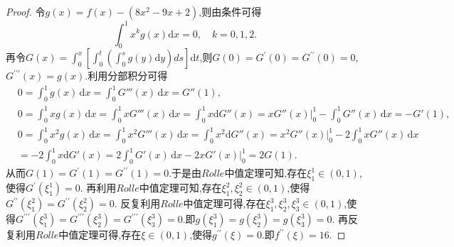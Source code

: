 \documentclass[../../main.tex]{subfiles}%
\begin{document}
\begin{proof}
令\(g(x)=f(x)-(8x^2 - 9x + 2)\),则由条件可得
\[
\int_0^1 x^k g(x)\mathrm{d}x = 0, \quad k = 0,1,2.
\]
再令\(G(x)=\int_0^x\left[\int_0^t\left(\int_0^s g(y)\mathrm{d}y\right)ds\right]\mathrm{d}t\),则\(G(0)=G^\prime(0)=G^{\prime\prime}(0)=0\),\(G^{\prime\prime\prime}(x)=g(x)\).利用分部积分可得
\begin{align*}
&0=\int_0^1{g\left( x \right)\,\mathrm{d}x}=\int_0^1{G'''\left( x \right)\,\mathrm{d}x}=G''\left( 1 \right) ,
\\
&0=\int_0^1{xg\left( x \right)\,\mathrm{d}x}=\int_0^1{xG'''\left( x \right)\,\mathrm{d}x}=\int_0^1{x\mathrm{d}G''\left( x \right)}=xG''\left( x \right) \Big |_{0}^{1}-\int_0^1{G''\left( x \right)\,\mathrm{d}x}=-G'\left( 1 \right) ,
\\
&0=\int_0^1{x^2g\left( x \right)\,\mathrm{d}x}=\int_0^1{x^2G'''\left( x \right)\,\mathrm{d}x}=\int_0^1{x^2\mathrm{d}G''\left( x \right)}=x^2G''\left( x \right) \Big |_{0}^{1}-2\int_0^1{xG''\left( x \right)\,\mathrm{d}x}
\\
&=-2\int_0^1{x\mathrm{d}G'\left( x \right)}=2\int_0^1{G'\left( x \right)\,\mathrm{d}x}-2xG'\left( x \right) \Big |_{0}^{1}=2G\left( 1 \right) .
\end{align*}
从而\(G(1)=G^\prime(1)=G^{\prime\prime}(1)=0\).于是由\(Rolle\)中值定理可知,存在\(\xi_1^1\in(0,1)\),使得\(G^\prime(\xi_1^1)=0\).
再利用\(Rolle\)中值定理可知,存在\(\xi_1^2,\xi_2^2\in(0,1)\),使得\(G^{\prime\prime}(\xi_1^2)=G^{\prime\prime}(\xi_2^2)=0\).
反复利用\(Rolle\)中值定理可得,存在\(\xi_1^3,\xi_2^3,\xi_3^3\in(0,1)\),使得\(G^{\prime\prime\prime}(\xi_1^3)=G^{\prime\prime\prime}(\xi_2^3)=G^{\prime\prime\prime}(\xi_3^3)=0\).即\(g(\xi_1^3)=g(\xi_2^3)=g(\xi_3^3)=0\).
再反复利用\(Rolle\)中值定理可得,存在\(\xi\in(0,1)\),使得\(g^{\prime\prime}(\xi)=0\).即\(f^{\prime\prime}(\xi)=16\).
\end{proof}
\end{document}
